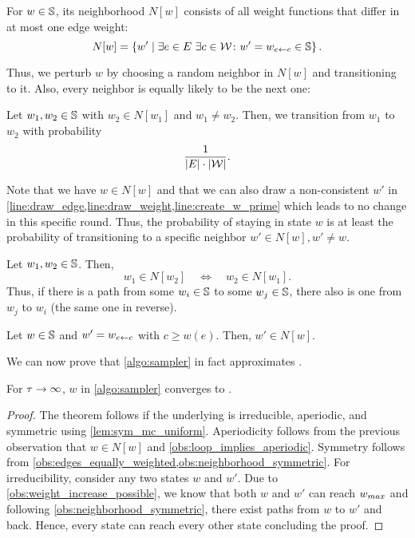 \begin{definition}[Neighborhood]
  For $w \in \mathbb S$, its neighborhood $N[w]$ consists of all weight functions that differ in at most one edge weight: \[
    N[w] = \left\{w' \mid \exists e \in E\,\,\exists c \in \mathcal W\colon w' = w_{e \gets c} \in \mathbb S\right\}.
  \] 
\end{definition}

\noindent Thus, we perturb $w$ by choosing a random neighbor in $N[w]$ and transitioning to it.
Also, every neighbor is equally likely to be the next one:

\begin{observation}\label{obs:edges_equally_weighted}
  Let $w_1, w_2 \in \mathbb S$ with $w_2 \in N[w_1]$ and $w_1 \neq w_2$.
  Then, we transition from $w_1$ to $w_2$ with probability \[
    \frac{1}{|E|\cdot|\mathcal W|}.
  \]
\end{observation}

\noindent Note that we have $w \in N[w]$ and that we can also draw a non-consistent $w'$ in \cref{line:draw_edge,line:draw_weight,line:create_w_prime} which leads to no change in this specific round.
Thus, the probability of staying in state $w$ is at least the probability of transitioning to a specific neighbor $w' \in N[w], w' \neq w$.

\begin{observation}\label{obs:neighborhood_symmetric}
  Let $w_1, w_2 \in \mathbb S$.
  Then, \[
    w_1 \in N[w_2]\quad\Longleftrightarrow\quad w_2 \in N[w_1].
  \]
  Thus, if there is a path from some $w_i \in \mathbb S$ to some $w_j \in \mathbb S$, there also is one from $w_j$ to $w_i$ (the same one in reverse).
\end{observation}

\begin{observation}\label{obs:weight_increase_possible}
  Let $w \in \mathbb S$ and $w' = w_{e \gets c}$ with $c \geq w(e)$.
  Then, $w' \in N[w]$.
\end{observation}

\bigskip

\noindent We can now prove that \cref{algo:sampler} in fact approximates \states.

\begin{theorem}\label{thm:sampler_is_uniform}
  For $\tau \to \infty$, $w$ in \cref{algo:sampler} converges to \states.
\end{theorem}
\begin{proof}
  The theorem follows if the underlying \markov is irreducible, aperiodic, and symmetric using \cref{lem:sym_mc_uniform}.
  Aperiodicity follows from the previous observation that $w \in N[w]$ and \cref{obs:loop_implies_aperiodic}.
  Symmetry follows from \cref{obs:edges_equally_weighted,obs:neighborhood_symmetric}.
  For irreducibility, consider any two states $w$ and $w'$.
  Due to \cref{obs:weight_increase_possible}, we know that both $w$ and $w'$ can reach $w_{max}$ and following \cref{obs:neighborhood_symmetric}, there exist paths from $w$ to $w'$ and back.
  Hence, every state can reach every other state concluding the proof.
\end{proof}

